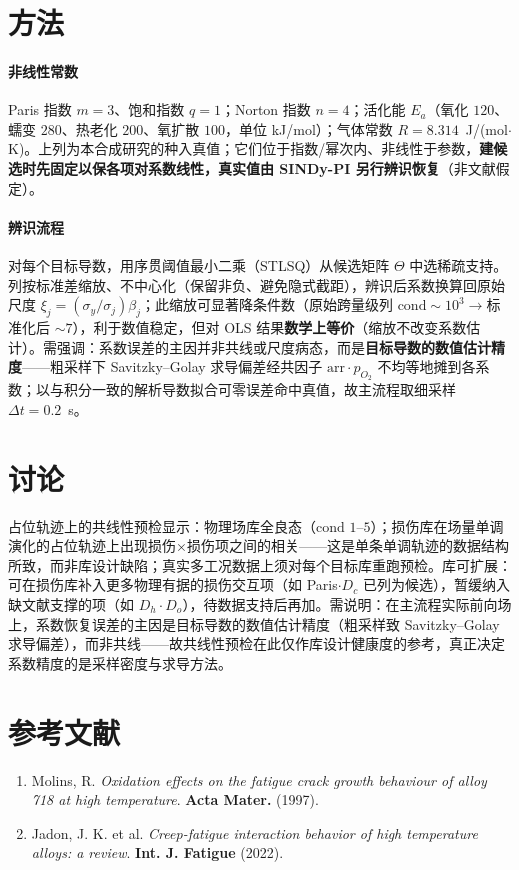 \documentclass[11pt,a4paper]{article}
\begin{document}
\section{方法}
\paragraph{非线性常数} Paris 指数 $m=3$、饱和指数 $q=1$；Norton 指数 $n=4$；活化能 $E_a$（氧化 $120$、蠕变 $280$、热老化 $200$、氧扩散 $100$，单位 kJ/mol）；气体常数 $R=8.314$~J/(mol$\cdot$K)。上列为本合成研究的种入真值；它们位于指数/幂次内、非线性于参数，\textbf{建候选时先固定以保各项对系数线性，真实值由 SINDy-PI 另行辨识恢复}（非文献假定）。

\paragraph{辨识流程} 对每个目标导数，用序贯阈值最小二乘（STLSQ）从候选矩阵 $\Theta$ 中选稀疏支持。列按标准差缩放、不中心化（保留非负、避免隐式截距），辨识后系数换算回原始尺度 $\xi_j=(\sigma_y/\sigma_j)\beta_j$；此缩放可显著降条件数（原始跨量级列 $\mathrm{cond}\!\sim\!10^3\to$标准化后 $\sim\!7$），利于数值稳定，但对 OLS 结果\textbf{数学上等价}（缩放不改变系数估计）。需强调：系数误差的主因并非共线或尺度病态，而是\textbf{目标导数的数值估计精度}——粗采样下 Savitzky--Golay 求导偏差经共因子 $\mathrm{arr}\cdot p_{O_2}$ 不均等地摊到各系数；以与积分一致的解析导数拟合可零误差命中真值，故主流程取细采样 $\Delta t{=}0.2$~s。

\section{讨论}
占位轨迹上的共线性预检显示：物理场库全良态（$\mathrm{cond}$ $1$--$5$）；损伤库在场量单调演化的占位轨迹上出现损伤×损伤项之间的相关——这是单条单调轨迹的数据结构所致，而非库设计缺陷；真实多工况数据上须对每个目标库重跑预检。库可扩展：可在损伤库补入更多物理有据的损伤交互项（如 Paris$\cdot D_c$ 已列为候选），暂缓纳入缺文献支撑的项（如 $D_h\!\cdot\! D_o$），待数据支持后再加。需说明：在主流程实际前向场上，系数恢复误差的主因是目标导数的数值估计精度（粗采样致 Savitzky--Golay 求导偏差），而非共线——故共线性预检在此仅作库设计健康度的参考，真正决定系数精度的是采样密度与求导方法。

\section*{参考文献}
\begin{enumerate}\setlength{\itemsep}{1pt}
\item Molins, R. \textit{Oxidation effects on the fatigue crack growth behaviour of alloy 718 at high temperature}. \textbf{Acta Mater.} (1997).
\item Jadon, J. K. et al. \textit{Creep-fatigue interaction behavior of high temperature alloys: a review}. \textbf{Int. J. Fatigue} (2022).
\end{enumerate}
\end{document}
